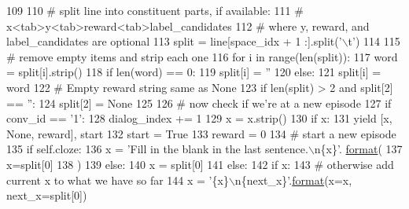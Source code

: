 \begin{DoxyCode}
109 
110                 \textcolor{comment}{# split line into constituent parts, if available:}
111                 \textcolor{comment}{# x<tab>y<tab>reward<tab>label\_candidates}
112                 \textcolor{comment}{# where y, reward, and label\_candidates are optional}
113                 split = line[space\_idx + 1 :].split(\textcolor{stringliteral}{'\(\backslash\)t'})
114 
115                 \textcolor{comment}{# remove empty items and strip each one}
116                 \textcolor{keywordflow}{for} i \textcolor{keywordflow}{in} range(len(split)):
117                     word = split[i].strip()
118                     \textcolor{keywordflow}{if} len(word) == 0:
119                         split[i] = \textcolor{stringliteral}{''}
120                     \textcolor{keywordflow}{else}:
121                         split[i] = word
122                 \textcolor{comment}{# Empty reward string same as None}
123                 \textcolor{keywordflow}{if} len(split) > 2 \textcolor{keywordflow}{and} split[2] == \textcolor{stringliteral}{''}:
124                     split[2] = \textcolor{keywordtype}{None}
125 
126                 \textcolor{comment}{# now check if we're at a new episode}
127                 \textcolor{keywordflow}{if} conv\_id == \textcolor{stringliteral}{'1'}:
128                     dialog\_index += 1
129                     x = x.strip()
130                     \textcolor{keywordflow}{if} x:
131                         \textcolor{keywordflow}{yield} [x, \textcolor{keywordtype}{None}, reward], start
132                     start = \textcolor{keyword}{True}
133                     reward = 0
134                     \textcolor{comment}{# start a new episode}
135                     \textcolor{keywordflow}{if} self.cloze:
136                         x = \textcolor{stringliteral}{'Fill in the blank in the last sentence.\(\backslash\)n\{x\}'}.
      \hyperlink{namespaceparlai_1_1chat__service_1_1services_1_1messenger_1_1shared__utils_a32e2e2022b824fbaf80c747160b52a76}{format}(
137                             x=split[0]
138                         )
139                     \textcolor{keywordflow}{else}:
140                         x = split[0]
141                 \textcolor{keywordflow}{else}:
142                     \textcolor{keywordflow}{if} x:
143                         \textcolor{comment}{# otherwise add current x to what we have so far}
144                         x = \textcolor{stringliteral}{'\{x\}\(\backslash\)n\{next\_x\}'}.\hyperlink{namespaceparlai_1_1chat__service_1_1services_1_1messenger_1_1shared__utils_a32e2e2022b824fbaf80c747160b52a76}{format}(x=x, next\_x=split[0])

\end{DoxyCode}
